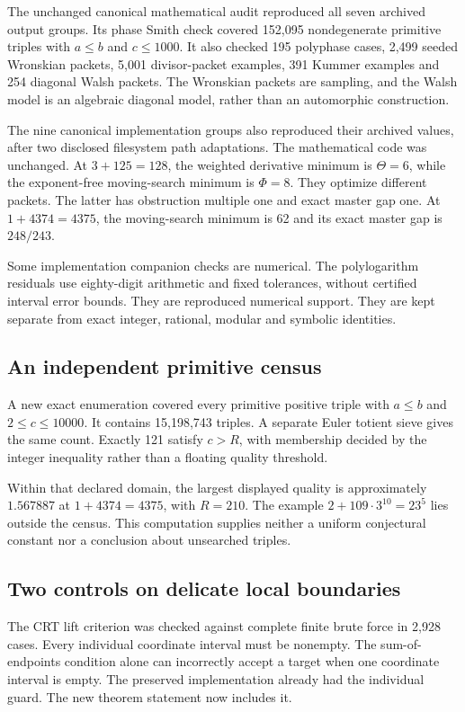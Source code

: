 The unchanged canonical mathematical audit reproduced all seven archived output groups. Its phase Smith check covered 152,095 nondegenerate primitive triples with $a\le b$ and $c\le1000$. It also checked 195 polyphase cases, 2,499 seeded Wronskian packets, 5,001 divisor-packet examples, 391 Kummer examples and 254 diagonal Walsh packets. The Wronskian packets are sampling, and the Walsh model is an algebraic diagonal model, rather than an automorphic construction.

The nine canonical implementation groups also reproduced their archived values, after two disclosed filesystem path adaptations. The mathematical code was unchanged. At $3+125=128$, the weighted derivative minimum is $\Theta=6$, while the exponent-free moving-search minimum is $\Phi=8$. They optimize different packets. The latter has obstruction multiple one and exact master gap one. At $1+4374=4375$, the moving-search minimum is 62 and its exact master gap is $248/243$.

Some implementation companion checks are numerical. The polylogarithm residuals use eighty-digit arithmetic and fixed tolerances, without certified interval error bounds. They are reproduced numerical support. They are kept separate from exact integer, rational, modular and symbolic identities.

\subsection{An independent primitive census}
A new exact enumeration covered every primitive positive triple with $a\le b$ and $2\le c\le10000$. It contains 15,198,743 triples. A separate Euler totient sieve gives the same count. Exactly 121 satisfy $c>R$, with membership decided by the integer inequality rather than a floating quality threshold.

Within that declared domain, the largest displayed quality is approximately $1.567887$ at $1+4374=4375$, with $R=210$. The example $2+109\cdot3^{10}=23^5$ lies outside the census. This computation supplies neither a uniform conjectural constant nor a conclusion about unsearched triples.

\subsection{Two controls on delicate local boundaries}
The CRT lift criterion was checked against complete finite brute force in 2,928 cases. Every individual coordinate interval must be nonempty. The sum-of-endpoints condition alone can incorrectly accept a target when one coordinate interval is empty. The preserved implementation already had the individual guard. The new theorem statement now includes it.

